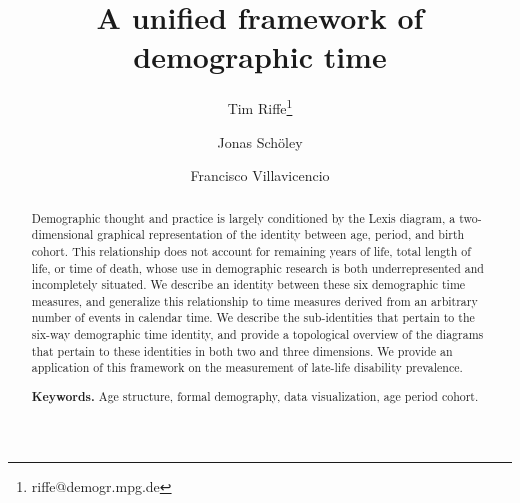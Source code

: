 \documentclass[12pt,oneside,a4paper]{article} %
\theoremstyle{definition}
\newcommand\ackn[1]{%
  \begingroup
  \renewcommand\thefootnote{}\footnote{#1}%
  \addtocounter{footnote}{-1}%
  \endgroup
}
\begin{document}
\title{A unified framework of demographic time}
\author[1]{Tim Riffe\thanks{riffe@demogr.mpg.de}}
\author[2,3]{Jonas Sch{\"o}ley}
\author[2,3]{Francisco Villavicencio}


\maketitle
\pagebreak
\begin{abstract}
Demographic thought and practice is largely conditioned by the Lexis diagram,
a two-dimensional graphical representation of the identity between age,
period, and birth cohort. This relationship does not account for remaining years
of life, total length of life, or time of death, whose use in
demographic research is both underrepresented and incompletely situated. We
describe an identity between these six demographic time measures, and generalize
this relationship to time measures derived from an arbitrary number of events in
calendar time. We describe the sub-identities that pertain to the six-way
demographic time identity, and provide a topological overview of the diagrams that pertain to
these identities in both two and three dimensions. We provide an application of
this framework on the measurement of late-life disability prevalence. 


\smallskip
\noindent \textbf{Keywords.} Age structure, formal demography, data
visualization, age period cohort.%
\end{abstract}

\end{document}
